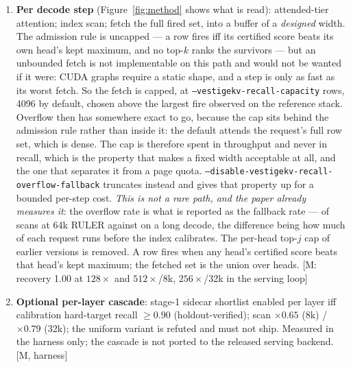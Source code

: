 \begin{enumerate}
  queries are then collected, and the \emph{calibrated} build --- 64-dim
  exact summand, rank-$r$ sketch from the covariance of those centered
  queries, per-row certificate, conformal $z$, entropy gate --- runs on a
  side stream and is atomically installed; the gate disables itself where it
  cannot calibrate. [M]
\item \textbf{Per decode step} (Figure~\ref{fig:method} shows what is read):
  attended-tier attention; index scan; fetch
  the full fired set, into a buffer of a \emph{designed} width. The admission
  rule is uncapped --- a row fires iff its certified score beats its own head's
  kept maximum, and no top-$k$ ranks the survivors --- but an unbounded fetch is
  not implementable on this path and would not be wanted if it were: CUDA graphs
  require a static shape, and a step is only as fast as its worst fetch. So the
  fetch is capped, at \texttt{--vestigekv-recall-capacity} rows, 4096 by
  default, chosen above the largest fire observed on the reference stack.
  Overflow then has somewhere exact to go, because the cap sits behind the
  admission rule rather than inside it: the default attends the request's full
  row set, which is dense. The cap is therefore spent in throughput and never in
  recall, which is the property that makes a fixed width acceptable at all, and
  the one that separates it from a page quota.
  \texttt{--disable-vestigekv-recall-overflow-fallback} truncates instead and
  gives that property up for a bounded per-step cost.
  \emph{This is not a rare path, and the paper already measures it}: the overflow
  rate is what is reported as the fallback rate --- \statsRulerSixtyFourFallback{}
  of scans at 64k RULER against \statsStreamOneTwoEightFallback{} on a long
  decode, the difference being how much of each request runs before the index
  calibrates. The per-head top-$j$ cap of earlier versions is removed. A row fires when any head's
  certified score beats that head's kept maximum; the fetched set is the
  union over heads. [M: recovery 1.00 at $128\times$
  and $512\times$/8k, $256\times$/32k in the serving loop]
\item \textbf{Optional per-layer cascade}: stage-1 sidecar shortlist enabled
  per layer iff calibration hard-target recall $\ge 0.90$
  (holdout-verified); scan $\times 0.65$ (8k) / $\times 0.79$ (32k); the
  uniform variant is refuted and must not ship. Measured in the harness
  only; the cascade is not ported to the released serving backend. [M, harness]
\end{enumerate}

